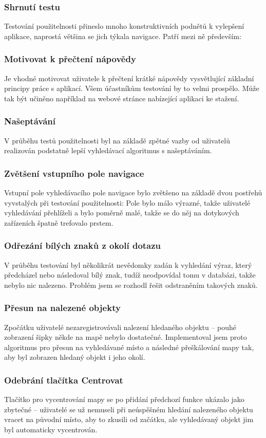 \subsubsection{Shrnutí testu}
Testování použitelnosti přineslo mnoho konstruktivních podnětů k vylepšení aplikace, naprostá většina se jich týkala navigace. Patří mezi ně především:
\subsubsection*{Motivovat k přečtení nápovědy}
Je vhodné motivovat uživatele k přečtení krátké nápovědy vysvětlující základní principy práce s aplikací. Všem účastníkům testování by to velmi prospělo. Může tak být učiněno například na webové stránce nabízející aplikaci ke stažení.
\subsubsection*{Našeptávání}
V průběhu testů použitelnosti byl na základě zpětné vazby od uživatelů realizován podstatně lepší vyhledávací algoritmus s našeptáváním.
\subsubsection*{Zvětšení vstupního pole navigace}
Vstupní pole vyhledávacího pole navigace bylo zvětšeno na základě dvou postřehů vyvstalých při testování použitelnosti: Pole bylo málo výrazné, takže uživatelé vyhledávání přehlíželi a bylo poměrně malé, takže se do něj na dotykových zařízeních špatně trefovalo prstem.
\subsubsection*{Odřezání bílých znaků z okolí dotazu}
V průběhu testování byl několikrát nevědomky zadán k vyhledání výraz, který předcházel nebo následoval bílý znak, tudíž neodpovídal tomu v databázi, takže nebylo nic nalezeno. Problém jsem se rozhodl řešit odstraněním takových znaků.
\subsubsection*{Přesun na nalezené objekty}
Zpočátku uživatelé nezaregistrovávali nalezení hledaného objektu -- pouhé zobrazení šipky někde na mapě nebylo dostatečné. Implementoval jsem proto algoritmus pro přesun na vyhledávané místo a následné přeškálování mapy tak, aby byl zobrazen hledaný objekt i jeho okolí.
\subsubsection*{Odebrání tlačítka Centrovat}
Tlačítko pro vycentrování mapy se po přidání předchozí funkce ukázalo jako zbytečné -- uživatelé se už nemuseli při neúspěšném hledání nalezeného objektu vracet na původní místo, aby to zkusili od začátku, ale vyhledávaný objekt jim byl automaticky vycentrován.

